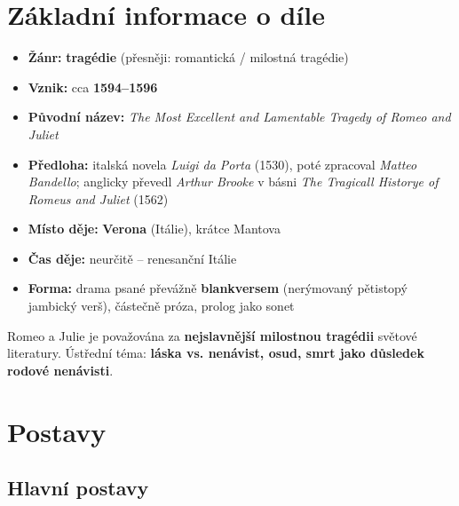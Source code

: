\documentclass[12pt,a4paper]{article}
\begin{document}
\section{Základní informace o díle}

\begin{itemize}[leftmargin=1.5em]
  \item \textbf{Žánr:} \textbf{tragédie} (přesněji: romantická / milostná tragédie)
  \item \textbf{Vznik:} cca \textbf{1594–1596}
  \item \textbf{Původní název:} \textit{The Most Excellent and Lamentable Tragedy of Romeo and Juliet}
  \item \textbf{Předloha:} italská novela \textit{Luigi da Porta} (1530), poté zpracoval \textit{Matteo Bandello}; anglicky převedl \textit{Arthur Brooke} v básni \textit{The Tragicall Historye of Romeus and Juliet} (1562)
  \item \textbf{Místo děje:} \textbf{Verona} (Itálie), krátce Mantova
  \item \textbf{Čas děje:} neurčitě – renesanční Itálie
  \item \textbf{Forma:} drama psané převážně \textbf{blankversem} (nerýmovaný pětistopý jambický verš), částečně próza, prolog jako sonet
\end{itemize}

\begin{dulez}
  Romeo a Julie je považována za \textbf{nejslavnější milostnou tragédii} světové literatury.
  Ústřední téma: \textbf{láska vs. nenávist, osud, smrt jako důsledek rodové nenávisti}.
\end{dulez}

\section{Postavy}

\subsection{Hlavní postavy}
\end{document}
